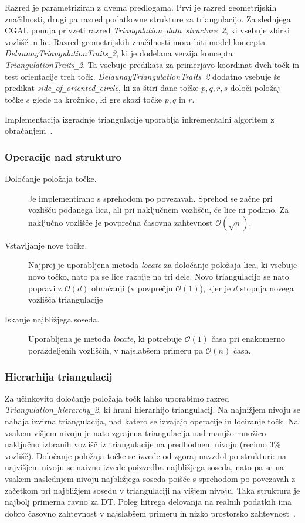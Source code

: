 \documentclass[a4paper, 12pt]{book}
\newcommand{\OO}{\ensuremath{\mathcal{O}}} %
\newcommand{\U}{\texttt{\_}}
\begin{document}
Razred je parametriziran z dvema predlogama. Prvi je razred geometrijskih značilnosti, drugi pa razred podatkovne strukture za triangulacijo. Za slednjega CGAL ponuja privzeti razred \textit{ Triangulation\U data\U structure\U 2}, ki vsebuje zbirki vozlišč in lic. Razred geometrijskih značilnosti mora biti model koncepta \textit{DelaunayTriangulationTraits\U 2}, ki je dodelana verzija koncepta \textit{TriangulationTraits\U 2}. Ta vsebuje predikata za primerjavo koordinat dveh točk in test orientacije treh točk. \textit{DelaunayTriangulationTraits\U 2} dodatno vsebuje še predikat \textit{side\U of\U oriented\U circle}, ki za štiri dane točke $p, q, r, s$ določi položaj točke $s$ glede na krožnico, ki gre skozi točke $p, q$ in $r$.

Implementacija izgradnje triangulacije uporablja inkrementalni algoritem z obračanjem~\cite{cgal:y-t2-16b}.

\subsubsection{Operacije nad strukturo}
\begin{description}
\item[Določanje položaja točke.] Je implementirano s sprehodom po povezavah. Sprehod se začne pri vozlišču podanega lica, ali pri naključnem vozlišču, če lice ni podano. Za naključno vozlišče je povprečna časovna zahtevnost $\OO(\sqrt{n})$.
\item[Vstavljanje nove točke.] Najprej je uporabljena metoda \textit{locate} za določanje položaja lica, ki vsebuje novo točko, nato pa se lice razbije na tri dele. Novo triangulacijo se nato popravi z $\OO(d)$ obračanji (v povprečju $\OO(1)$), kjer je $d$ stopnja novega vozlišča triangulacije
\item[Iskanje najbližjega soseda.] Uporabljena je metoda \textit{locate}, ki potrebuje $\OO(1)$ časa pri enakomerno porazdeljenih vozliščih, v najslabšem primeru pa $\OO(n)$ časa.
\end{description}

\subsubsection{Hierarhija triangulacij}
Za učinkovito določanje položaja točk lahko uporabimo razred \textit{Trian\-gu\-la\-tion\U hier\-archy\U 2}, ki hrani hierarhijo triangulacij. Na najnižjem nivoju se nahaja izvirna triangulacija, nad katero se izvajajo operacije in lociranje točk. Na vsakem višjem nivoju je nato zgrajena triangulacija nad manjšo množico naključno izbranih vozlišč iz triangulacije na predhodnem nivoju (recimo 3\% vozlišč). Določanje položaja točke se izvede od zgoraj navzdol po strukturi: na najvišjem nivoju se naivno izvede poizvedba najbližjega soseda, nato pa se na vsakem naslednjem nivoju najbližjega soseda poišče s sprehodom po povezavah z začetkom pri najbližjem sosedu v triangulaciji na višjem nivoju. Taka struktura je najbolj primerna ravno za DT. Poleg hitrega delovanja na realnih podatkih ima dobro časovno zahtevnost v najslabšem primeru in nizko prostorsko zahtevnost~\cite{Olivier}.
\end{document}
